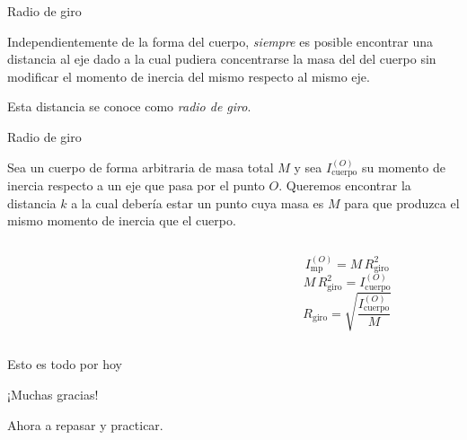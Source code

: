 \documentclass[11pt,handout,aspectratio=1610]{beamer}
\newcommand{\vs}{\vspace{0.3cm}}
\begin{document}
\begin{frame}{Radio de giro}

    Independientemente de la forma del cuerpo, \emph{siempre} es posible encontrar una distancia al eje dado a la cual pudiera concentrarse la masa del del cuerpo sin modificar el momento de inercia del mismo respecto al mismo eje. \pause

    \vspace{11pt}

    Esta distancia se conoce como \emph{radio de giro}.

\end{frame}

\begin{frame}{Radio de giro}

    Sea un cuerpo de forma arbitraria de masa total $M$ y sea $I_\text{cuerpo}^{(O)}$ su momento de inercia respecto a un eje que pasa por el punto $O$. \pause Queremos encontrar la distancia $k$ a la cual debería estar un punto cuya masa es $M$ para que produzca el mismo momento de inercia que el cuerpo.

    \begin{columns}
        \begin{column}{0.5\textwidth}
            \begin{figure}
                \centering
            \end{figure}
        \end{column} \pause
        \begin{column}{0.5\textwidth}
            {\small
            $$I_\text{mp}^{(O)} = M \, R_\text{giro}^2$$ \pause
            $$M \, R_\text{giro}^2 = I_\text{cuerpo}^{(O)}$$ \pause
            $$R_\text{giro} = \sqrt{\frac{I_\text{cuerpo}^{(O)}}{M}}$$
            }
        \end{column}
    \end{columns}

\end{frame}

\begin{frame}{Esto es todo por hoy}

    \begin{center}
        {\huge ¡Muchas gracias!}

        \vs

        Ahora a repasar y practicar.
    \end{center}

\end{frame}
\end{document}
